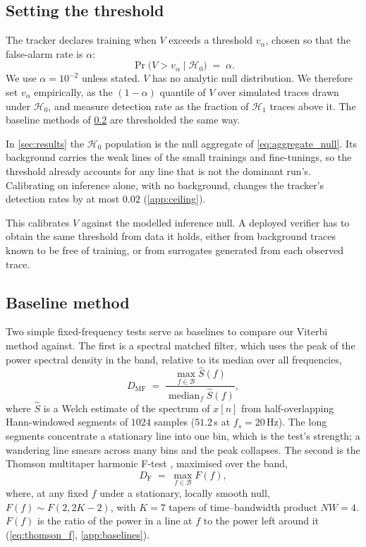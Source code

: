 \documentclass{article}
\begin{document}
\subsection{Setting the threshold}
\label{subsec:threshold}

The tracker declares training when $V$ exceeds a threshold $v_\alpha$, chosen
so that the false-alarm rate is $\alpha$:
\begin{equation}
	\Pr\bigl(V > v_\alpha \mid \mathcal{H}_0\bigr) \;=\; \alpha.
	\label{eq:far}
\end{equation}
We use $\alpha = 10^{-2}$ unless stated. $V$ has no analytic null
distribution. We therefore set $v_\alpha$ empirically, as the
$(1-\alpha)$ quantile of $V$ over simulated traces drawn under
$\mathcal{H}_0$, and measure detection rate as the fraction of $\mathcal{H}_1$
traces above it. The baseline methods of \cref{subsec:comparators} are thresholded
the same way.

In \cref{sec:results} the $\mathcal{H}_0$ population is the null aggregate of
\cref{eq:aggregate_null}. Its background carries the weak lines of the small
trainings and fine-tunings, so the threshold already accounts for any line
that is not the dominant run's. Calibrating on inference alone, with no
background, changes the tracker's detection rates by at most $0.02$
(\cref{app:ceiling}).

This calibrates $V$ against the modelled inference null. A deployed verifier
has to obtain the same threshold from data it holds, either from background traces
known to be free of training, or from
surrogates generated from each observed trace.

\subsection{Baseline method}
\label{subsec:comparators}

Two simple fixed-frequency tests serve as baselines to compare our Viterbi method against. The first is a
spectral matched filter, which uses the peak of the power spectral density in the band,
relative to its median over all frequencies,
\begin{equation}
	D_{\mathrm{MF}} \;=\;
	\frac{\max_{f \in \mathcal{B}} \hat S(f)}{\operatorname{median}_f \hat S(f)},
	\label{eq:matched}
\end{equation}
where $\hat S$ is a Welch estimate of the spectrum of $x[n]$ from half-overlapping
Hann-windowed segments of $1024$ samples ($51.2$\,s at $f_s = 20$\,Hz). The
long segments concentrate a stationary line into one bin, which is the
test's strength; a wandering line smears across many bins and the peak
collapses. The second is the Thomson multitaper harmonic F-test
\citep{thomson1982multitaper,percival1993spectral}, maximised over the band,
\begin{equation}
	D_{\mathrm{F}} \;=\; \max_{f \in \mathcal{B}} F(f),
	\label{eq:ftest}
\end{equation}
where, at any fixed $f$ under a stationary, locally smooth null, $F(f) \sim
F(2, 2K-2)$, with $K = 7$ tapers of time--bandwidth product $NW = 4$. $F(f)$ is the ratio of
the power in a line at $f$ to the power left around it
(\cref{eq:thomson_f}, \cref{app:baselines}). 
\end{document}
